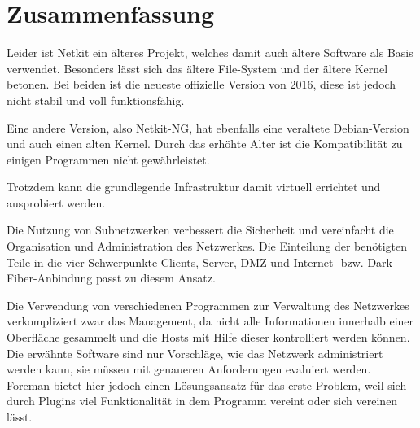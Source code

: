 \chapter{Zusammenfassung}
Leider ist Netkit ein älteres Projekt, welches damit auch ältere Software als Basis verwendet. Besonders lässt sich das ältere File-System und der ältere Kernel betonen. Bei beiden ist die neueste offizielle Version von 2016, diese ist jedoch nicht stabil und voll funktionsfähig.

Eine andere Version, also Netkit-NG, hat ebenfalls eine veraltete Debian-Version und auch einen alten Kernel. Durch das erhöhte Alter ist die Kompatibilität zu einigen Programmen nicht gewährleistet.

Trotzdem kann die grundlegende Infrastruktur damit virtuell errichtet und ausprobiert werden.

Die Nutzung von Subnetzwerken verbessert die Sicherheit und vereinfacht die Organisation und Administration des Netzwerkes. Die Einteilung der benötigten Teile in die vier Schwerpunkte Clients, Server, DMZ und Internet- bzw. Dark-Fiber-Anbindung passt zu diesem Ansatz.

Die Verwendung von verschiedenen Programmen zur Verwaltung des Netzwerkes verkompliziert zwar das Management, da nicht alle Informationen innerhalb einer Oberfläche gesammelt und die Hosts mit Hilfe dieser kontrolliert werden können. Die erwähnte Software sind nur Vorschläge, wie das Netzwerk administriert werden kann, sie müssen mit genaueren Anforderungen evaluiert werden. Foreman bietet hier jedoch einen Lösungsansatz für das erste Problem, weil sich durch Plugins viel Funktionalität in dem Programm vereint oder sich vereinen lässt.


